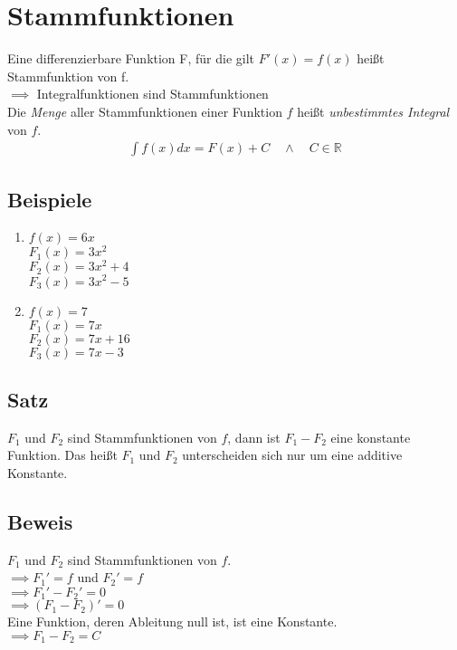 \documentclass[12pt, a4paper]{report}
\begin{document}
\section{Stammfunktionen}
Eine differenzierbare Funktion F, für die gilt $F'(x)=f(x)$ heißt Stammfunktion von f. \\
$\implies$ Integralfunktionen sind Stammfunktionen\\
Die \emph{Menge} aller Stammfunktionen einer Funktion $f$ heißt \emph{unbestimmtes Integral} von $f$.\\

\begin{equation}
\begin{aligned}
\int f(x) dx=F(x)+C \quad \land \quad C\in \mathbb{R}
\end{aligned}
\end{equation}

\subsection{Beispiele}
\begin{enumerate}
\item $f(x)=6x$\\
$F_1(x)=3x^2$\\
$F_2(x)=3x^2+4$\\
$F_3(x)=3x^2-5$
\item $f(x)=7$\\
$F_1(x)=7x$\\
$F_2(x)=7x+16$\\
$F_3(x)=7x-3$
\end{enumerate}

\subsection{Satz}
$F_1$ und $F_2$ sind Stammfunktionen von $f$, dann ist $F_1-F_2$ eine konstante Funktion. Das heißt $F_1$ und $F_2$ unterscheiden sich nur um eine additive Konstante.

\subsection{Beweis}
$F_1$ und $F_2$ sind Stammfunktionen von $f$.\\
$\implies F_1' = f$ und $F_2' = f$\\
$\implies F_1'-F_2' = 0$\\
$\implies (F_1-F_2)' = 0$\\
Eine Funktion, deren Ableitung null ist, ist eine Konstante.\\
$\implies F_1-F_2 = C$
\end{document}
